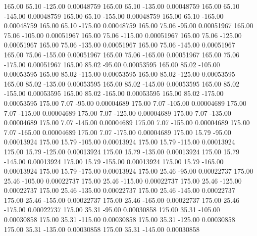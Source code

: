     165.00     65.10   -125.00     0.00048759
    165.00     65.10   -135.00     0.00048759
    165.00     65.10   -145.00     0.00048759
    165.00     65.10   -155.00     0.00048759
    165.00     65.10   -165.00     0.00048759
    165.00     65.10   -175.00     0.00048759
    165.00     75.06    -95.00     0.00051967
    165.00     75.06   -105.00     0.00051967
    165.00     75.06   -115.00     0.00051967
    165.00     75.06   -125.00     0.00051967
    165.00     75.06   -135.00     0.00051967
    165.00     75.06   -145.00     0.00051967
    165.00     75.06   -155.00     0.00051967
    165.00     75.06   -165.00     0.00051967
    165.00     75.06   -175.00     0.00051967
    165.00     85.02    -95.00     0.00053595
    165.00     85.02   -105.00     0.00053595
    165.00     85.02   -115.00     0.00053595
    165.00     85.02   -125.00     0.00053595
    165.00     85.02   -135.00     0.00053595
    165.00     85.02   -145.00     0.00053595
    165.00     85.02   -155.00     0.00053595
    165.00     85.02   -165.00     0.00053595
    165.00     85.02   -175.00     0.00053595
    175.00      7.07    -95.00     0.00004689
    175.00      7.07   -105.00     0.00004689
    175.00      7.07   -115.00     0.00004689
    175.00      7.07   -125.00     0.00004689
    175.00      7.07   -135.00     0.00004689
    175.00      7.07   -145.00     0.00004689
    175.00      7.07   -155.00     0.00004689
    175.00      7.07   -165.00     0.00004689
    175.00      7.07   -175.00     0.00004689
    175.00     15.79    -95.00     0.00013924
    175.00     15.79   -105.00     0.00013924
    175.00     15.79   -115.00     0.00013924
    175.00     15.79   -125.00     0.00013924
    175.00     15.79   -135.00     0.00013924
    175.00     15.79   -145.00     0.00013924
    175.00     15.79   -155.00     0.00013924
    175.00     15.79   -165.00     0.00013924
    175.00     15.79   -175.00     0.00013924
    175.00     25.46    -95.00     0.00022737
    175.00     25.46   -105.00     0.00022737
    175.00     25.46   -115.00     0.00022737
    175.00     25.46   -125.00     0.00022737
    175.00     25.46   -135.00     0.00022737
    175.00     25.46   -145.00     0.00022737
    175.00     25.46   -155.00     0.00022737
    175.00     25.46   -165.00     0.00022737
    175.00     25.46   -175.00     0.00022737
    175.00     35.31    -95.00     0.00030858
    175.00     35.31   -105.00     0.00030858
    175.00     35.31   -115.00     0.00030858
    175.00     35.31   -125.00     0.00030858
    175.00     35.31   -135.00     0.00030858
    175.00     35.31   -145.00     0.00030858
